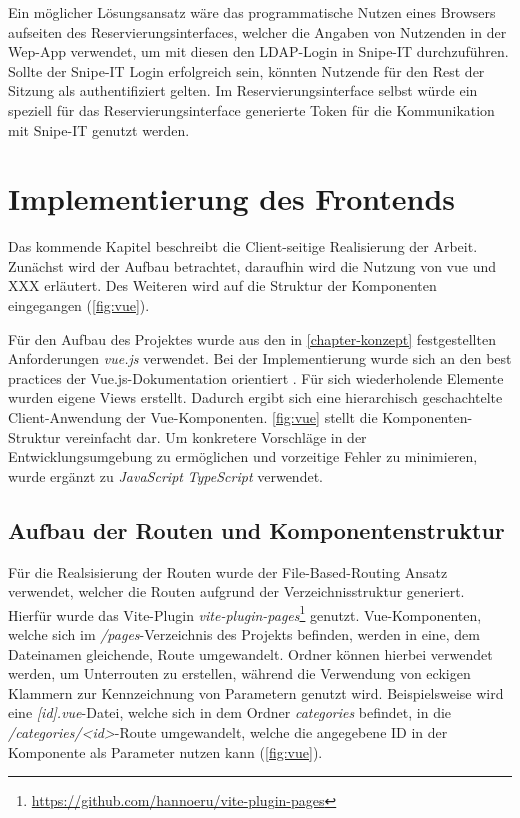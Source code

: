 Ein möglicher Lösungsansatz wäre das programmatische Nutzen eines Browsers aufseiten des
Reservierungsinterfaces, welcher die Angaben von Nutzenden in der Wep-App verwendet, um mit diesen
den LDAP-Login in Snipe-IT durchzuführen. Sollte der Snipe-IT Login erfolgreich sein, könnten
Nutzende für den Rest der Sitzung als authentifiziert gelten. Im Reservierungsinterface selbst
würde ein speziell für das Reservierungsinterface generierte Token für die Kommunikation mit
Snipe-IT genutzt werden. 


\section{Implementierung des Frontends} 
Das kommende Kapitel beschreibt die Client-seitige Realisierung der Arbeit. Zunächst wird der Aufbau
  betrachtet, daraufhin wird die Nutzung von vue und XXX erläutert. Des Weiteren wird auf die
  Struktur der Komponenten eingegangen (\ref{fig:vue}). 


Für den Aufbau des Projektes wurde aus den in \ref{chapter-konzept} festgestellten Anforderungen
\textit{vue.js} verwendet. Bei der Implementierung wurde sich an den best practices der
Vue.js-Dokumentation orientiert . Für sich wiederholende Elemente wurden
eigene Views erstellt. Dadurch ergibt sich eine hierarchisch geschachtelte Client-Anwendung der
Vue-Komponenten. \ref{fig:vue} stellt die Komponenten-Struktur vereinfacht dar. Um
konkretere Vorschläge in der Entwicklungsumgebung zu ermöglichen und vorzeitige Fehler zu
minimieren, wurde ergänzt zu \textit{JavaScript} \textit{TypeScript} verwendet.

\subsection{Aufbau der Routen und Komponentenstruktur}
Für die Realsisierung der Routen wurde der File-Based-Routing Ansatz verwendet, welcher die Routen
aufgrund der Verzeichnisstruktur generiert. Hierfür wurde das Vite-Plugin
\textit{vite-plugin-pages}\footnote{\url{https://github.com/hannoeru/vite-plugin-pages}} genutzt.
Vue-Komponenten, welche sich im \textit{/pages}-Verzeichnis des Projekts befinden, werden in eine,
dem Dateinamen gleichende, Route umgewandelt. Ordner können hierbei verwendet werden, um Unterrouten
zu erstellen, während die Verwendung von eckigen Klammern zur Kennzeichnung von Parametern genutzt
wird. Beispielsweise wird eine \textit{[id].vue}-Datei, welche sich
in dem Ordner \textit{categories} befindet, in die \textit{/categories/<id>}-Route umgewandelt,
welche die angegebene ID in der Komponente als Parameter nutzen kann (\ref{fig:vue}). 
 
